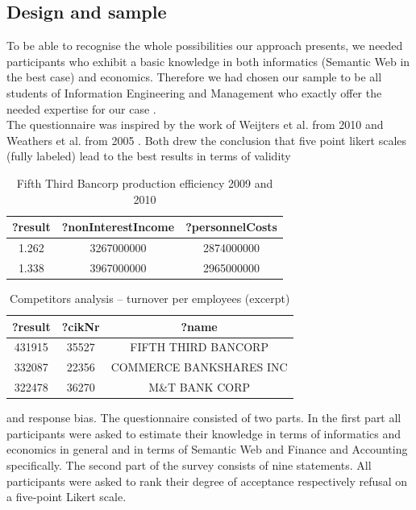 \documentclass[runningheads]{llncs}
\begin{document}
\subsection{Design and sample}
To be able to recognise the whole possibilities our approach presents, we needed participants who exhibit a basic knowledge in both informatics (Semantic Web in the best case) and economics. Therefore we had chosen our sample to be all students of Information Engineering and Management who exactly offer the needed expertise for our case \cite{GeTa03}. \\
The questionnaire was inspired by the work of Weijters et al. from 2010 \cite{WeCS10} and Weathers et al. from 2005 \cite{WeSN05}. Both drew the conclusion that five point likert scales (fully labeled) lead to the best results in terms of validity
\begin{table}
\centering
\begin{tabular}[htp]{|c|c|c|}
\hline
\textbf{?result} & \textbf{?nonInterestIncome} &  \textbf{?personnelCosts}\\
\hline
\hline
1.262 & 3267000000 & 2874000000\\
\hline
1.338 & 3967000000 & 2965000000\\
\hline
\end{tabular}
\caption{Fifth Third Bancorp production efficiency 2009 and 2010}
\end{table}
\begin{table}
\centering
\begin{tabular}[htp]{|c|c|c|}
\hline
\textbf{?result} & \textbf{?cikNr} & \textbf{?name} \\
\hline
\hline
431915 & 35527 & FIFTH THIRD BANCORP\\
\hline
332087 & 22356 & COMMERCE BANKSHARES INC\\
\hline
322478 & 36270 & M\&T BANK CORP\\
\hline
\end{tabular}
\caption{Competitors analysis -- turnover per employees (excerpt)}
\end{table}
and response bias. The questionnaire consisted of two parts. In the first part all participants were asked to estimate their knowledge in terms of informatics and economics in general and in terms of Semantic Web and Finance and Accounting specifically.
The second part of the survey consists of nine statements.
All participants were asked to rank their degree of acceptance respectively refusal on a five-point Likert scale.
\end{document}
